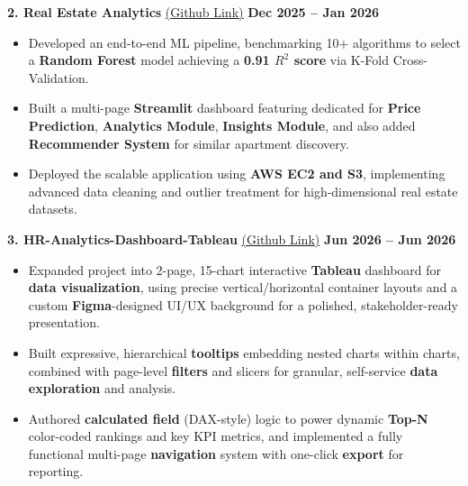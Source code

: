 \documentclass[9pt]{article}
\begin{document}
{\noindent \bf 2. Real Estate Analytics} 
\href{https://github.com/keshavsays08/Real-Estate-Web-Analytics-Project-Public}{{\color{blue} \underline{(Github Link)}}}
\hfill \textbf{Dec 2025 -- Jan 2026}
{\small
\begin{itemize}[leftmargin=*, nosep, topsep=1.5pt, itemsep=0.5pt]
    \item Developed an end-to-end ML pipeline, benchmarking 10+ algorithms to select a \textbf{Random Forest} model achieving a \textbf{0.91 $R^2$ score} via K-Fold Cross-Validation.
    \item Built a multi-page \textbf{Streamlit} dashboard featuring dedicated for \textbf{Price Prediction}, \textbf{Analytics Module}, \textbf{Insights Module}, and also added \textbf{Recommender System} for similar apartment discovery.
    \item Deployed the scalable application using \textbf{AWS EC2 and S3}, implementing advanced data cleaning and outlier treatment for high-dimensional real estate datasets.
\end{itemize}
}
\vspace{2pt}

{\noindent \bf 3. HR-Analytics-Dashboard-Tableau}
\href{https://github.com/keshavsays08/HR-Dashboard-Tableau-Project}{{\color{blue} \underline{(Github Link)}}}
\hfill \textbf{Jun 2026 -- Jun 2026}
{\small
\begin{itemize}[leftmargin=*, nosep, topsep=1.5pt, itemsep=0.5pt]
    \item Expanded project into 2-page, 15-chart interactive \textbf{Tableau} dashboard for \textbf{data visualization}, using precise vertical/horizontal container layouts and a custom \textbf{Figma}-designed UI/UX background for a polished, stakeholder-ready presentation.
    \item Built expressive, hierarchical \textbf{tooltips} embedding nested charts within charts, combined with page-level \textbf{filters} and slicers for granular, self-service \textbf{data exploration} and analysis.
    \item Authored \textbf{calculated field} (DAX-style) logic to power dynamic \textbf{Top-N} color-coded rankings and key KPI metrics, and implemented a fully functional multi-page \textbf{navigation} system with one-click \textbf{export} for reporting.
\end{itemize}
}

\end{document}
